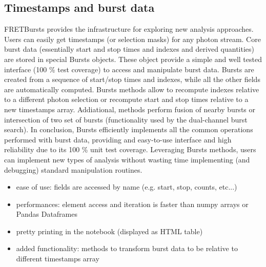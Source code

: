 \subsection{Timestamps and burst data}
\label{sec:burststimes}

FRETBursts provides the infrastructure for exploring new analysis approaches.
Users can easily get timestamps (or selection masks) for any photon stream.
Core burst data (essentially start and stop times and indexes 
and derived quantities) are stored in special Bursts objects.
These object provide a simple and well tested interface (100 \% test coverage) 
to access and manipulate burst data. Bursts are created from a sequence of start/stop 
times and indexes, while all the other fields are automatically
computed. Bursts methods allow to recompute indexes relative to a different photon
selection or recompute start and stop times relative to a new timestamps array.
Addiational, methods perform fusion of nearby bursts or intersection of two set
of bursts (functionality used by the dual-channel burst search).
In conclusion, Bursts efficiently implements all the common operations performed 
with burst data, providing and easy-to-use interface and high reliability due to 
its 100 \% unit test coverage. Leveraging Bursts methods, users can implement new 
types of analysis without wasting time implementing (and debugging) standard
manipulation routines.

\begin{itemize}
\item ease of use: fields are accessed by name (e.g. start, stop, counts, etc...)
\item performances: element access and iteration is faster than numpy arrays or Pandas Dataframes
\item pretty printing in the notebook (displayed as HTML table)
\item added functionality: methods to transform burst data to be relative to different timestamps array
\end{itemize}

